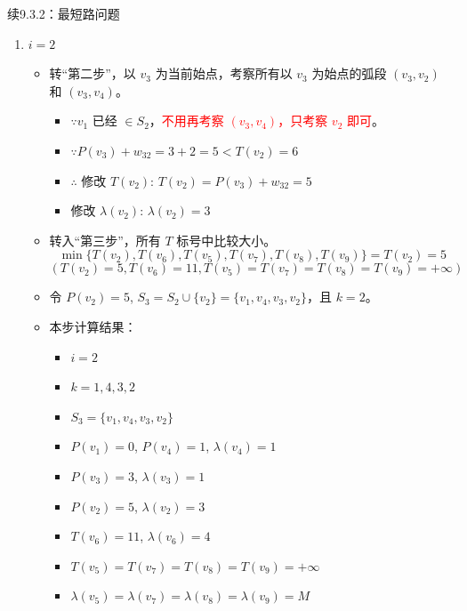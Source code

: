 \begin{exbox}{续9.3.2：最短路问题}{}
\begin{enumerate}[label=(\arabic*)]
			\item \( i = 2 \)
			\begin{itemize}
				\item 转“第二步”，以 \( v_3 \) 为当前始点，考察所有以 \( v_3 \) 为始点的弧段 \( (v_3, v_2) \) 和 \( (v_3, v_4) \)。
				\begin{itemize}
					\item \(\because v_1 \) 已经 \( \in S_2 \)，\textcolor{red}{不用再考察 \( (v_3, v_4) \)，只考察 \( v_2 \) 即可}。
					\item \(\because P(v_3) + w_{32} = 3 + 2 = 5 < T(v_2) = 6 \)
					\item \(\therefore\) 修改 \( T(v_2) \): \( T(v_2) = P(v_3) + w_{32} = 5 \)
					\item 修改 \( \lambda(v_2) \): \( \lambda(v_2) = 3 \)
				\end{itemize}
				\item 转入“第三步”，所有 \( T \) 标号中比较大小。
				\[
				\min \{T(v_2), T(v_6), T(v_5), T(v_7), T(v_8), T(v_9)\} = T(v_2) = 5
				\]
				\[
				(T(v_2) = 5, T(v_6) = 11, T(v_5) = T(v_7) = T(v_8) = T(v_9) = +\infty)
				\]
				\item 令 \( P(v_2) = 5 \), \( S_3 = S_2 \cup \{v_2\} = \{v_1, v_4, v_3, v_2\} \)，且 \( k = 2 \)。
				\item 本步计算结果：
				\begin{itemize}
					\item \( i = 2 \)
					\item \( k = 1, 4, 3, 2 \)
					\item \( S_3 = \{v_1, v_4, v_3, v_2\} \)
					\item \( P(v_1) = 0 \), \( P(v_4) = 1 \), \( \lambda(v_4) = 1 \)
					\item \( P(v_3) = 3 \), \( \lambda(v_3) = 1 \)
					\item \( P(v_2) = 5 \), \( \lambda(v_2) = 3 \)
					\item \( T(v_6) = 11 \), \( \lambda(v_6) = 4 \)
					\item \( T(v_5) = T(v_7) = T(v_8) = T(v_9) = +\infty \)
					\item \( \lambda(v_5) = \lambda(v_7) = \lambda(v_8) = \lambda(v_9) = M \)
				\end{itemize}
			\end{itemize}
		

\end{enumerate}
\end{exbox}
